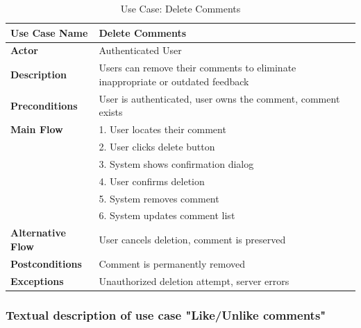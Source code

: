 \begin{table}[H]
\centering
\caption{Use Case: Delete Comments}
\begin{tabular}{|p{3cm}|p{10cm}|}
\hline
\textbf{Use Case Name} & Delete Comments \\
\hline
\textbf{Actor} & Authenticated User \\
\hline
\textbf{Description} & Users can remove their comments to eliminate inappropriate or outdated feedback \\
\hline
\textbf{Preconditions} & User is authenticated, user owns the comment, comment exists \\
\hline
\textbf{Main Flow} & 
1. User locates their comment \\
& 2. User clicks delete button \\
& 3. System shows confirmation dialog \\
& 4. User confirms deletion \\
& 5. System removes comment \\
& 6. System updates comment list \\
\hline
\textbf{Alternative Flow} & User cancels deletion, comment is preserved \\
\hline
\textbf{Postconditions} & Comment is permanently removed \\
\hline
\textbf{Exceptions} & Unauthorized deletion attempt, server errors \\
\hline
\end{tabular}
\end{table}

\subsubsection{Textual description of use case "Like/Unlike comments"}

